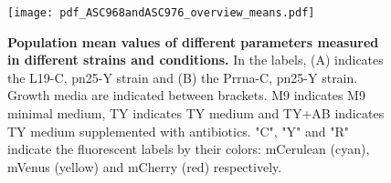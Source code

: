 \begin{figure}
    \centering
    \texttt{[image: pdf\_ASC968andASC976\_overview\_means.pdf]}
    \caption{ 
        \textbf{Population mean values of different parameters measured in different strains and conditions.}
        In the labels, (A) indicates the L19-C, pn25-Y strain and (B) the Prrna-C, pn25-Y strain.
        Growth media are indicated between brackets. 
        M9 indicates M9 minimal medium, TY indicates TY medium and TY+AB indicates TY medium supplemented with antibiotics.
        "C", "Y" and "R" indicate the fluorescent labels by their colors: mCerulean (cyan), mVenus (yellow) and mCherry (red) respectively.        
    }
    \label{fig:ribo:meansPn25R}
\end{figure}



